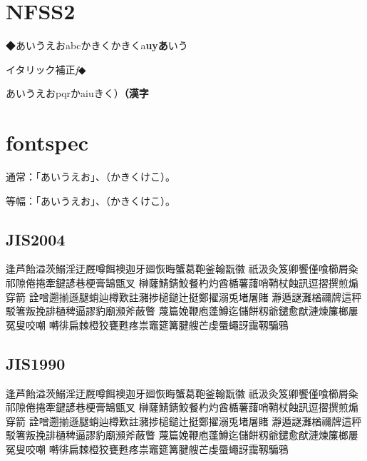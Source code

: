 \documentclass{article}
\begin{document}
\section{NFSS2}


◆あいうえおabcかきく{\gt かきくa{\bf uyあ}いう}

{イタリック補正\textit{f}◆\par}

あいうえおpqr{\dr かaiu}きく）{\bf （漢字}









\section{fontspec}

\setmainfont{TeXGyreTermes}
\setsansfont{TeXGyreHeros}


\newjfontfamily{}

通常：「あいうえお」、（かきくけこ）。

{
\noindent 等幅：「あいうえお」、（かきくけこ）。
}

\subsection{JIS2004}
逢芦飴溢茨鰯淫迂厩噂餌襖迦牙廻恢晦蟹葛鞄釜翰翫徽
祇汲灸笈卿饗僅喰櫛屑粂祁隙倦捲牽鍵諺巷梗膏鵠甑叉
榊薩鯖錆鮫餐杓灼酋楯薯藷哨鞘杖蝕訊逗摺撰煎煽穿箭
詮噌遡揃遜腿蛸辿樽歎註瀦捗槌鎚辻挺鄭擢溺兎堵屠賭
瀞遁謎灘楢禰牌這秤駁箸叛挽誹樋稗逼謬豹廟瀕斧蔽瞥
蔑篇娩鞭庖蓬鱒迄儲餅籾爺鑓愈猷漣煉簾榔屢冤叟咬嘲
囀徘扁棘橙狡甕甦疼祟竈筵篝腱艘芒虔蜃蠅訝靄靱騙鴉

\subsection{JIS1990}
{\ipajisninety
逢芦飴溢茨鰯淫迂厩噂餌襖迦牙廻恢晦蟹葛鞄釜翰翫徽
祇汲灸笈卿饗僅喰櫛屑粂祁隙倦捲牽鍵諺巷梗膏鵠甑叉
榊薩鯖錆鮫餐杓灼酋楯薯藷哨鞘杖蝕訊逗摺撰煎煽穿箭
詮噌遡揃遜腿蛸辿樽歎註瀦捗槌鎚辻挺鄭擢溺兎堵屠賭
瀞遁謎灘楢禰牌這秤駁箸叛挽誹樋稗逼謬豹廟瀕斧蔽瞥
蔑篇娩鞭庖蓬鱒迄儲餅籾爺鑓愈猷漣煉簾榔屢冤叟咬嘲
囀徘扁棘橙狡甕甦疼祟竈筵篝腱艘芒虔蜃蠅訝靄靱騙鴉
}
\end{document}
